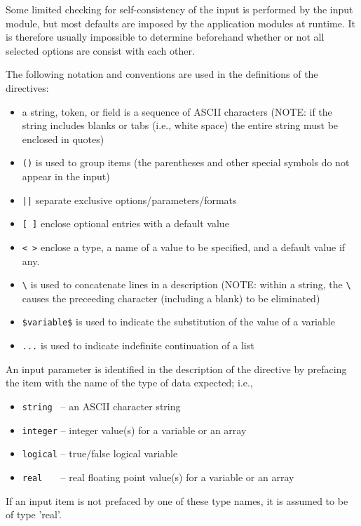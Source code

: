Some limited checking for self-consistency of the input is performed
by the input module, but most defaults are imposed by the application
modules at runtime.  It is therefore usually impossible to determine
beforehand whether or not all selected options are consist with each
other.

The following notation and conventions are used in the definitions of
the directives:

\begin{itemize}
\item a string, token, or field is a sequence of ASCII characters (NOTE: if 
the string includes blanks or tabs (i.e., white space) the entire string must
be enclosed in quotes)
\item \verb+()+ is used to group items (the parentheses and other
      special symbols do not appear in the input)
\item \verb+||+ separate exclusive options/parameters/formats
\item \verb+[ ]+ enclose optional entries with a default value
\item \verb+< >+ enclose a type, a name of a value to be specified,
      and a default value if any.

\item \verb+\+ is used to concatenate lines in a description (NOTE: within 
a string, the \verb+\+ causes the preceeding character (including a blank) 
to be eliminated) 
\item \verb+$variable$+ is used to indicate the substitution of the value of a
      variable
\item \verb+...+ is used to indicate indefinite continuation of a list
\end{itemize}

An input parameter is identified in the description of the directive
by prefacing the item with the name of the type of data expected;
i.e.,

\begin{itemize}
\item \verb+string +  -- an ASCII character string
\item \verb+integer+ --  integer value(s) for a variable or an array
\item \verb+logical+ --  true/false logical variable
\item \verb+real   +  -- real floating point value(s) for a variable or an array
\end{itemize}

If an input item is not prefaced by one of these type names,
it is assumed to be of type 'real'.
 
